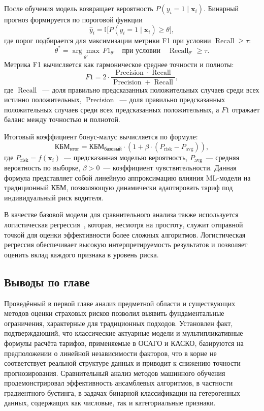 После обучения модель возвращает вероятность $P(y_i = 1 \mid \mathbf{x}_i)$. Бинарный прогноз формируется по пороговой функции
\[
\hat{y}_i = \mathbb{I}\bigl[P(y_i = 1 \mid \mathbf{x}_i) \geq \theta\bigr],
\]
где порог подбирается для максимизации метрики F1 при условии $\operatorname{Recall} \geq \tau$:
\[
\theta^* = \underset{\theta'}{\arg\max} \, F1_{\theta'} \quad \text{при условии} \quad \operatorname{Recall}_{\theta'} \geq \tau.
\]
Метрика F1 вычисляется как гармоническое среднее точности и полноты:
\[
F1 = 2 \cdot \frac{\operatorname{Precision} \cdot \operatorname{Recall}}{\operatorname{Precision} + \operatorname{Recall}},
\]
где $\operatorname{Recall}$~--- доля правильно предсказанных положительных случаев среди всех истинно положительных, $\operatorname{Precision}$~--- доля правильно предсказанных положительных случаев среди всех предсказанных положительных, а $F1$ отражает баланс между точностью и полнотой.

Итоговый коэффициент бонус-малус вычисляется по формуле:
\[
\text{КБМ}_{\text{итог}} = \text{КБМ}_{\text{базовый}} \cdot \left( 1 + \beta \cdot (P_{\text{risk}} - P_{\text{avg}}) \right),
\]
где $P_{\text{risk}} = f(\mathbf{x}_i)$~--- предсказанная моделью вероятность, $P_{\text{avg}}$~--- средняя вероятность по выборке, $\beta > 0$~--- коэффициент чувствительности. Данная формула представляет собой линейную аппроксимацию влияния ML-модели на традиционный КБМ, позволяющую динамически адаптировать тариф под индивидуальный риск водителя.

В качестве базовой модели для сравнительного анализа также используется логистическая регрессия~\cite{yasenev2012pattern}, которая, несмотря на простоту, служит отправной точкой для оценки эффективности более сложных алгоритмов. Логистическая регрессия обеспечивает высокую интерпретируемость результатов и позволяет оценить вклад каждого признака в уровень риска.

\subsection{Выводы по главе}

Проведённый в первой главе анализ предметной области и существующих методов оценки страховых рисков позволил выявить фундаментальные ограничения, характерные для традиционных подходов. Установлен факт, подтверждающий, что классические актуарные модели и мультипликативные формулы расчёта тарифов, применяемые в ОСАГО и КАСКО, базируются на предположении о линейной независимости факторов, что в корне не соответствует реальной структуре данных и приводит к снижению точности прогнозирования. Сравнительный анализ методов машинного обучения продемонстрировал эффективность ансамблевых алгоритмов, в частности градиентного бустинга, в задачах бинарной классификации на гетерогенных данных, содержащих как числовые, так и категориальные признаки.

